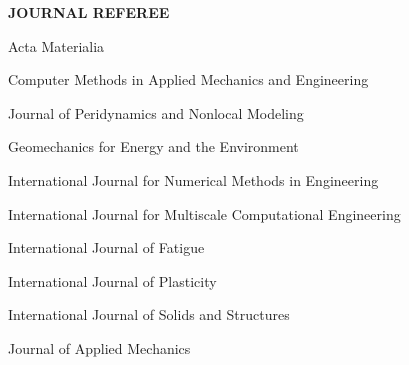 
\vspace{\sectionskip}
\noindent
{\large \textbf{JOURNAL REFEREE}}
\vspace{\sectionskip}

\begin{minipage}{\minipagewidth}
Acta Materialia
\end{minipage}\vspace{\itemskip}

\begin{minipage}{\minipagewidth}
Computer Methods in Applied Mechanics and Engineering
\end{minipage}\vspace{\itemskip}

\begin{minipage}{\minipagewidth}
Journal of Peridynamics and Nonlocal Modeling
\end{minipage}\vspace{\itemskip}

\begin{minipage}{\minipagewidth}
Geomechanics for Energy and the Environment
\end{minipage}\vspace{\itemskip}

\begin{minipage}{\minipagewidth}
International Journal for Numerical Methods in Engineering
\end{minipage}\vspace{\itemskip}

\begin{minipage}{\minipagewidth}
International Journal for Multiscale Computational Engineering
\end{minipage}\vspace{\itemskip}

\begin{minipage}{\minipagewidth}
International Journal of Fatigue
\end{minipage}\vspace{\itemskip}

\begin{minipage}{\minipagewidth}
International Journal of Plasticity
\end{minipage}\vspace{\itemskip}

\begin{minipage}{\minipagewidth}
International Journal of Solids and Structures
\end{minipage}\vspace{\itemskip}

\begin{minipage}{\minipagewidth}
Journal of Applied Mechanics
\end{minipage}\vspace{\itemskip}
